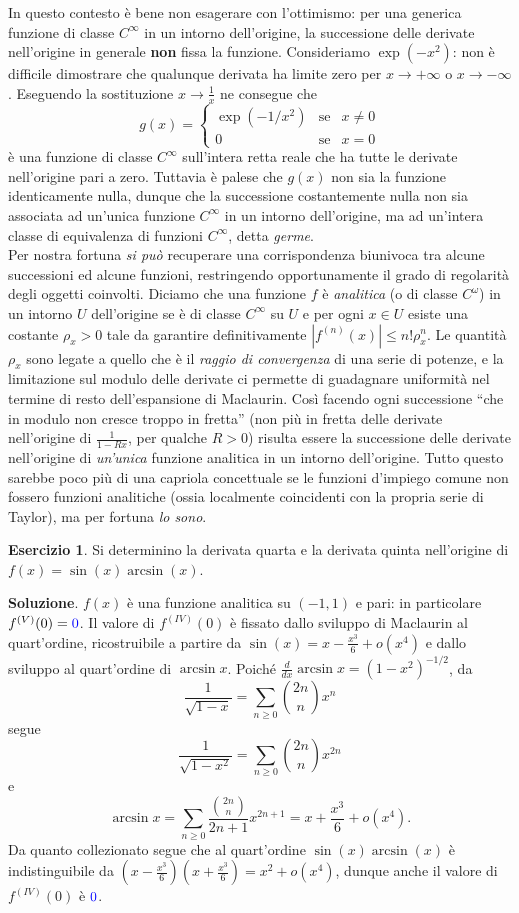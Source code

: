 \documentclass[a4paper,twoside]{article}
\theoremstyle{definition}
\newtheorem{ex}[theorem]{Esercizio}
\numberwithin{theorem}{section}
\begin{document}
In questo contesto è bene non esagerare con l'ottimismo: per una generica funzione di classe $C^{\infty}$ in un intorno dell'origine, la successione delle derivate nell'origine in generale \textbf{non} fissa la funzione. Consideriamo $\exp(-x^2)$: non è difficile dimostrare che qualunque derivata ha limite zero per $x\to +\infty$ o $x\to -\infty$. Eseguendo la sostituzione $x\to \frac{1}{x}$ ne consegue che 
$$ g(x) = \left\{\begin{array}{rcl}\exp(-1/x^2)&\text{se}&x\neq 0\\ 0 &\text{se}&x=0\end{array}\right. $$
è una funzione di classe $C^\infty$ sull'intera retta reale che ha tutte le derivate nell'origine pari a zero. Tuttavia è palese che $g(x)$ non sia la funzione identicamente nulla, dunque che la successione costantemente nulla non sia associata ad un'unica funzione $C^\infty$ in un intorno dell'origine, ma ad un'intera classe di equivalenza di funzioni $C^\infty$, detta \emph{germe}.\\

Per nostra fortuna \emph{si può} recuperare una corrispondenza biunivoca tra alcune successioni ed alcune funzioni, restringendo opportunamente il grado di regolarità degli oggetti coinvolti. Diciamo che una funzione $f$ è \emph{analitica} (o di classe $C^\omega$) in un intorno $U$ dell'origine se è di classe $C^\infty$ su $U$ e per ogni $x\in U$ esiste una costante $\rho_x > 0$ tale da garantire definitivamente $|f^{(n)}(x)|\leq n! \rho_x^n$. Le quantità $\rho_x$ sono legate a quello che è il \emph{raggio di convergenza} di una serie di potenze, e la limitazione sul modulo delle derivate ci permette di guadagnare uniformità nel termine di resto dell'espansione di Maclaurin. Così facendo ogni successione ``che in modulo non cresce troppo in fretta'' (non più in fretta delle derivate nell'origine di $\frac{1}{1-Rx}$, per qualche $R>0$) risulta essere la successione delle derivate nell'origine di \emph{un'unica} funzione analitica in un intorno dell'origine. Tutto questo sarebbe poco più di una capriola concettuale se le funzioni d'impiego comune non fossero funzioni analitiche (ossia localmente coincidenti con la propria serie di Taylor), ma per fortuna \emph{lo sono}.

\begin{ex} Si determinino la derivata quarta e la derivata quinta nell'origine di $f(x)=\sin(x)\arcsin(x)$. 
\end{ex}
\textbf{Soluzione}. $f(x)$ è una funzione analitica su $(-1,1)$ e pari: in particolare $f^{(V)}(0)={\color{blue}0}$. Il valore di $f^{(IV)}(0)$ è fissato dallo sviluppo di Maclaurin al quart'ordine, ricostruibile a partire da $\sin(x)=x-\frac{x^3}{6}+o(x^4)$ e dallo sviluppo al quart'ordine di $\arcsin x$. Poiché $\frac{d}{dx}\arcsin x = (1-x^2)^{-1/2}$, da 
$$ \frac{1}{\sqrt{1-x}} = \sum_{n\geq 0}\binom{2n}{n}x^n $$
segue 
$$ \frac{1}{\sqrt{1-x^2}}= \sum_{n\geq 0}\binom{2n}{n} x^{2n} $$
e 
$$ \arcsin x = \sum_{n\geq 0}\frac{\binom{2n}{n}}{2n+1}x^{2n+1} = x + \frac{x^3}{6} + o(x^4).$$
Da quanto collezionato segue che al quart'ordine $\sin(x)\arcsin(x)$ è indistinguibile da $\left(x-\frac{x^3}{6}\right)\left(x+\frac{x^3}{6}\right)=x^2+o(x^4)$, dunque anche il valore di $f^{(IV)}(0)$ è $\color{blue}0$.
\end{document}
